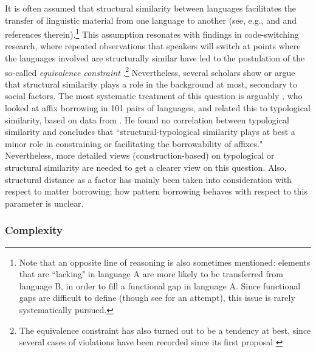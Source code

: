 \documentclass[output=paper]{langscibook}
\begin{document}
\noindent It is often assumed that structural similarity between languages facilitates the transfer of linguistic material from one language to another (see, e.g., \cite{bowern2013relatedness} and \cite{seifart2015does} and references therein).\footnote{Note that an opposite line of reasoning is also sometimes mentioned: elements that are ``lacking" in language A are more likely to be transferred from language B, in order to fill a functional gap in language A. Since functional gaps are difficult to define (though see \cite{hale1975gaps} for an attempt), this issue is rarely systematically pursued.} This assumption resonates with findings in code-switching research, where repeated observations that speakers will switch at points where the languages involved are structurally similar have led to the postulation of the so-called \textit{equivalence constraint} \parencite{poplack1978dialect,poplack1980sometimes}.\footnote{The equivalence constraint has also turned out to be a tendency at best, since several cases of violations have been recorded since its first proposal \parencite[130]{matras2010language}} Nevertheless, several scholars \parencite{thomasonetal1988language,bowern2013relatedness, seifart2015does} show or argue that structural similarity plays a role in the background at most, secondary to social factors. The most systematic treatment of this question is arguably \textcite{seifart2015does}, who looked at affix borrowing in 101 pairs of languages, and related this to typological similarity, based on data from \textcite{wals}. He found no correlation between typological similarity and concludes that ``structural-typological similarity plays at best a minor role in constraining or facilitating the borrowability of affixes." Nevertheless, more detailed views (construction-based) on typological or structural similarity are needed to get a clearer view on this question. Also, structural distance as a factor has mainly been taken into consideration with respect to matter borrowing; how pattern borrowing behaves with respect to this parameter is unclear.

\subsubsection{Complexity}
\end{document}
